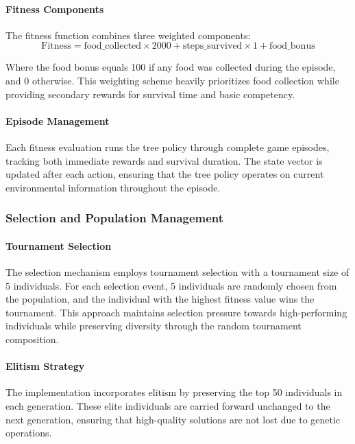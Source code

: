 \documentclass[a4paper,12pt]{article}
\begin{document}
\paragraph{Fitness Components} The fitness function combines three weighted components:
\begin{equation}
   \text{Fitness} = \text{food\_collected} \times 2000 + \text{steps\_survived} \times 1 + \text{food\_bonus}
\end{equation}

Where the food bonus equals 100 if any food was collected during the episode, and 0 otherwise. This weighting scheme heavily prioritizes food collection while providing secondary rewards for survival time and basic competency.

\paragraph{Episode Management} Each fitness evaluation runs the tree policy through complete game episodes, tracking both immediate rewards and survival duration. The state vector is updated after each action, ensuring that the tree policy operates on current environmental information throughout the episode.

\subsubsection{Selection and Population Management}

\paragraph{Tournament Selection} The selection mechanism employs tournament selection with a tournament size of 5 individuals. For each selection event, 5 individuals are randomly chosen from the population, and the individual with the highest fitness value wins the tournament. This approach maintains selection pressure towards high-performing individuals while preserving diversity through the random tournament composition.

\paragraph{Elitism Strategy} The implementation incorporates elitism by preserving the top 50 individuals in each generation. These elite individuals are carried forward unchanged to the next generation, ensuring that high-quality solutions are not lost due to genetic operations.
\end{document}
